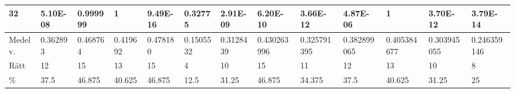 \documentclass[a4paper,10pt]{article}
\begin{document}
\begin{centering}
{\begin{tabular}{ |l|l|l|l|l|l|l|l|l|l|l|l|l| }
	32	       & 5.10E-08 & 0.999999 & 1        & 9.49E-16 & 0.32775   &  2.91E-09      &  6.20E-10 & 3.66E-12 & 4.87E-06 & 1        & 3.70E-12 & 3.79E-14 \\ \hline\hline                                    
	Medelv.    & 0.362893 & 0.468764 & 0.419692 & 0.478180 & 0.1505532 & 0.3128439 		&  0.430263996 & 0.325791395 & 0.382899065 & 0.405384677 & 0.303945055 & 0.246359146 \\ \hline
	Rätt & 12       & 15       &  13     & 15        & 4       & 10   			&15		& 11 & 12 & 13 & 10 & 8 \\ \hline
	\%		   & 37.5     & 46.875   &  40.625     & 46.875        & 12.5       & 31.25 &  46.875 & 34.375 & 37.5 & 40.625 & 31.25 & 25 \\ \hline
	\end{tabular}	

}
\end{centering}
\end{document}
